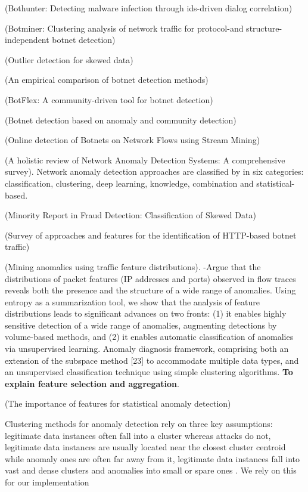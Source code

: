 \documentclass[review]{elsarticle}
\begin{document}
\cite{gu2007bothunter} (Bothunter: Detecting malware infection through ids-driven dialog correlation)

\cite{gu2008botminer} (Botminer: Clustering analysis of network traffic for protocol-and structure-independent botnet detection)

\cite{hubert2008outlier} (Outlier detection for skewed data)

\cite{garcia2014empirical} (An empirical comparison of botnet detection methods)

\cite{khattak2015botflex} (BotFlex: A community-driven tool for botnet detection)

\cite{wang2017botnet} (Botnet detection based on anomaly and community detection)

\cite{da2018online} (Online detection of Botnets on Network Flows using Stream Mining)

\cite{moustafa2019holistic} (A holistic review of Network Anomaly Detection Systems: A comprehensive survey). Network anomaly detection approaches are classified by \cite{moustafa2019holistic} in six categories: classification, clustering, deep learning, knowledge, combination and statistical-based.

\cite{Phua2004minority} (Minority Report in Fraud Detection: Classification of Skewed Data)

\cite{acarali2016survey} (Survey of approaches and features for the identification of HTTP-based botnet traffic)

\cite{lakhina2005mining} (Mining anomalies using traffic feature distributions).  -Argue that the distributions of packet features (IP addresses and ports) observed in flow traces reveals both the presence and the structure of a wide range of anomalies. Using entropy as a summarization tool, we show that the analysis of feature distributions leads to significant advances on two fronts: (1) it enables highly sensitive detection of a wide range of anomalies, augmenting detections by volume-based methods, and (2) it enables automatic classification of anomalies via unsupervised learning. Anomaly diagnosis framework, comprising both an extension of the subspace method [23] to accommodate multiple data types, and an unsupervised classification technique using simple clustering algorithms. \textbf{To explain feature selection and aggregation}.

\cite{goldberg2015importance} (The importance of features for statistical anomaly detection)

Clustering methods for anomaly detection rely on three key assumptions: legitimate data instances often fall into a cluster whereas attacks do not, legitimate data instances are usually located near the closest cluster centroid while anomaly ones are often far away from it, legitimate data instances fall into vast and dense clusters and anomalies into small or spare ones \cite{ahmed2016survey, moustafa2019holistic}. We rely on this for our implementation
\end{document}
